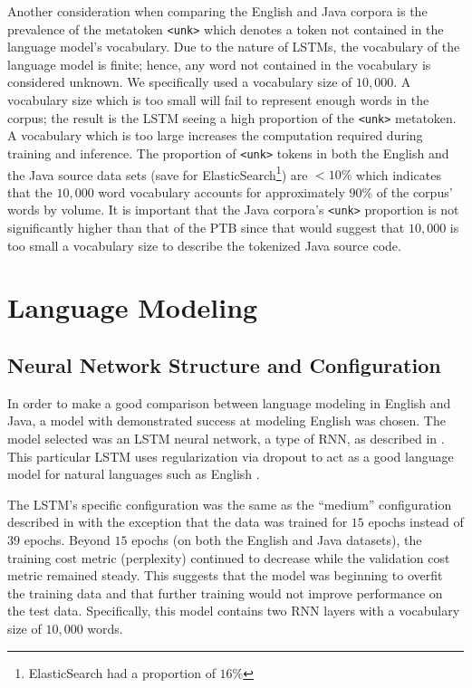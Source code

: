 \documentclass[runningheads,a4paper]{llncs}
\begin{document}
Another consideration when comparing the English and Java corpora is the
prevalence of the metatoken \texttt{<unk>} which denotes a token not contained
in the language model's vocabulary.
Due to the nature of LSTMs, the vocabulary of the language model is finite;
hence, any word not contained in the vocabulary is considered unknown.
We specifically used a vocabulary size of $10,000$. A vocabulary size which
is too small will fail to represent enough words in the corpus; the result
is the LSTM seeing a high proportion of the \texttt{<unk>} metatoken. A
vocabulary which is too large increases the computation required during
training and inference.
The proportion of \texttt{<unk>} tokens in both the English and the Java
source data sets (save for ElasticSearch\footnote{ElasticSearch had a
proportion of $16\%$}) are $<10\%$ which indicates that
the $10,000$ word vocabulary accounts for approximately $90\%$ of the corpus'
words by volume. It is important that the Java corpora's \texttt{<unk>}
proportion is not significantly higher than that of the PTB since
that would suggest that $10,000$ is too small a vocabulary size to describe
the tokenized Java source code.

\section{Language Modeling}
\label{language-modeling}

\subsection{Neural Network Structure and Configuration}

In order to make a good comparison between language modeling in English
and Java, a model with demonstrated success at modeling English was
chosen. The model selected was an LSTM neural
network, a type of RNN, as described in
\citet{LSTMArticle}. This particular LSTM uses regularization via 
dropout to act as a good language model for natural languages
such as English \cite{LSTMArticle}.

The LSTM's specific configuration was the same as the ``medium''
configuration described in \citet{LSTMArticle} with the exception
that the data was trained for $15$ epochs instead of $39$ epochs.
Beyond $15$ epochs (on both the English and Java datasets), the 
training cost metric (perplexity) continued to decrease while the
validation cost metric remained steady. This suggests that the model
was beginning to overfit the training data and that further training
would not improve performance on the test data.
Specifically, this model contains two RNN layers with a vocabulary
size of $10,000$ words.
\end{document}
